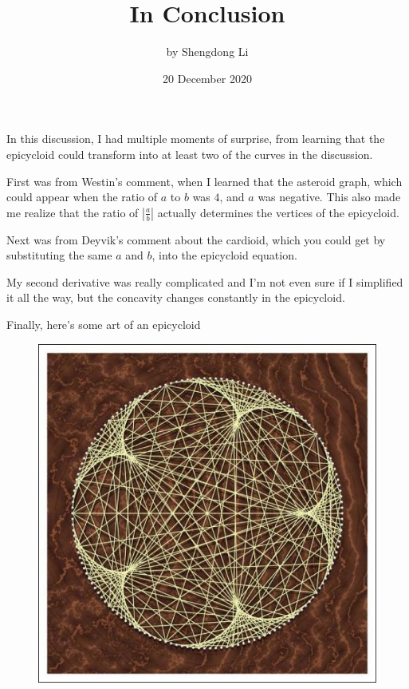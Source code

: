 \documentclass[12pt]{article}
\begin{document}
\title{In Conclusion}
\author{by Shengdong Li}
\date{20 December 2020}
\maketitle


In this discussion, I had multiple moments of surprise, from learning that the epicycloid could transform into at least two of the curves in the discussion.

First was from Westin's comment, when I learned that the asteroid graph, which could appear when the ratio of $a$ to $b$ was $4$, and $a$ was negative. This also made me realize that the ratio of $\left|\frac{a}{b}\right|$ actually determines the vertices of the epicycloid.

Next was from Deyvik's comment about the cardioid, which you could get by substituting the same $a$ and $b$, into the epicycloid equation.

My second derivative was really complicated and I'm not even sure if I simplified it all the way, but the concavity changes constantly in the epicycloid.

Finally, here's some art of an epicycloid

\begin{figure}[H]
  \begin{center}
    \includegraphics[scale=.3]{1.jpg}
  \end{center}
\end{figure}
\end{document}
